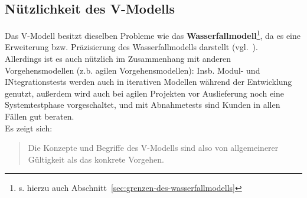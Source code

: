 \subsection*{Nützlichkeit des V-Modells}
Das V-Modell besitzt dieselben Probleme wie das \textbf{Wasserfallmodell}\footnote{
s. hierzu auch Abschnitt~\ref{sec:grenzen-des-wasserfallmodells}
}, da es eine Erweiterung bzw. Präzisierung des Wasserfallmodells darstellt (vgl.~\cite[12]{Wed09c}).\\
Allerdings ist es auch nützlich im Zusammenhang mit anderen Vorgehensmodellen (z.b. agilen Vorgehensmodellen): Insb. Modul- und INtegrationstests werden auch in iterativen Modellen während der Entwicklung genutzt, außerdem wird auch bei agilen Projekten vor Auslieferung noch eine Systemtestphase vorgeschaltet, und mit Abnahmetests sind Kunden in allen Fällen gut beraten.\\

\noindent
Es zeigt sich:

\blockquote[{\cite[12]{Wed09c}}]{
    Die Konzepte und Begriffe des V-Modells sind also von allgemeinerer Gültigkeit als das konkrete Vorgehen.
}